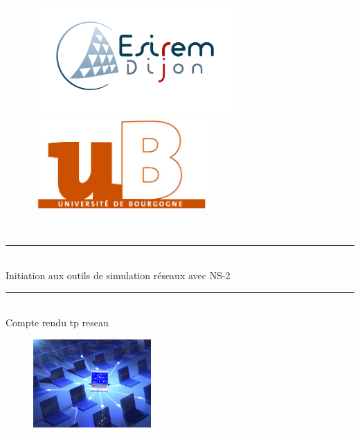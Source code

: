 \documentclass[11pt]{article}
\begin{document}
\begin{titlepage}
	\newcommand{\HRule}{\rule{\linewidth}{0.2mm}}     
            
	\begin{figure}[t]
		\begin{minipage}{0.5\textwidth}\large
			\begin{flushleft}
				\includegraphics[width=0.7\textwidth]{assets/logoEsirem.jpg}
			\end{flushleft}
		\end{minipage}
		\begin{minipage}{0.5\textwidth}\large
			\begin{flushright}
			\includegraphics[width=0.6\textwidth]{assets/logoUb.jpg}
			\end{flushright}
		\end{minipage}
	\end{figure}
	\textsc{ \\[1cm]}
     
     
	\begin{center}
	\HRule \\
	{\Large   
		Initiation aux outils de simulation réseaux avec NS-2
	}
	\HRule
	\\[0.5cm]
	{\large Compte rendu tp reseau \\}
   \end{center}

	\begin{figure}[h]
		\begin{center}
			\includegraphics[width=0.4\textwidth]{assets/main.jpg}
		\end{center}
	\end{figure}
        

\end{titlepage}
\end{document}
